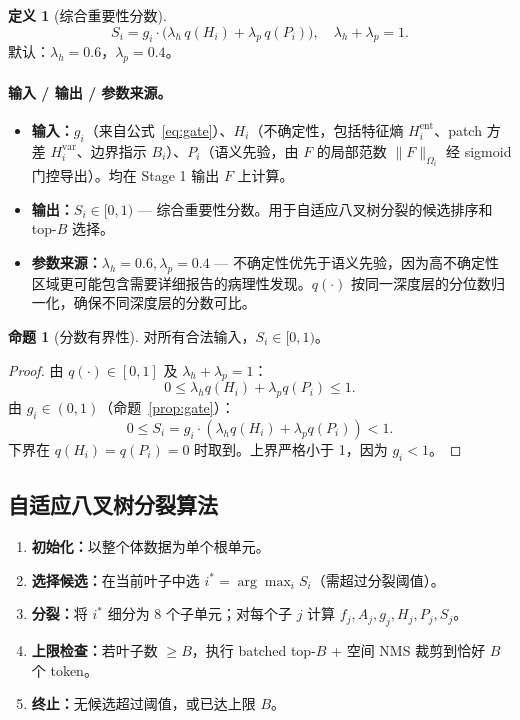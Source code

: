 \documentclass[11pt,a4paper]{article}
\theoremstyle{definition}
\newtheorem{definition}{定义}[section]
\newtheorem{proposition}{命题}[section]
\begin{document}
\begin{definition}[综合重要性分数]
\begin{equation}\label{eq:score}
S_i = g_i \cdot \big(\lambda_h \, q(H_i) + \lambda_p \, q(P_i)\big), \quad \lambda_h + \lambda_p = 1.
\end{equation}
默认：$\lambda_h = 0.6$，$\lambda_p = 0.4$。

\paragraph{输入 / 输出 / 参数来源。}
\begin{itemize}[nosep]
    \item \textbf{输入：}$g_i$（来自公式~\ref{eq:gate}）、$H_i$（不确定性，包括特征熵 $H_i^{\mathrm{ent}}$、patch 方差 $H_i^{\mathrm{var}}$、边界指示 $B_i$）、$P_i$（语义先验，由 $F$ 的局部范数 $\|F\|_{\Omega_i}$ 经 sigmoid 门控导出）。均在 Stage 1 输出 $F$ 上计算。
    \item \textbf{输出：}$S_i \in [0,1)$ — 综合重要性分数。用于自适应八叉树分裂的候选排序和 top-$B$ 选择。
    \item \textbf{参数来源：}$\lambda_h = 0.6, \lambda_p = 0.4$ — 不确定性优先于语义先验，因为高不确定性区域更可能包含需要详细报告的病理性发现。$q(\cdot)$ 按同一深度层的分位数归一化，确保不同深度层的分数可比。
\end{itemize}
\end{definition}

\begin{proposition}[分数有界性]\label{prop:score}
对所有合法输入，$S_i \in [0, 1)$。
\end{proposition}
\begin{proof}
由 $q(\cdot) \in [0,1]$ 及 $\lambda_h + \lambda_p = 1$：
\[
0 \leq \lambda_h q(H_i) + \lambda_p q(P_i) \leq 1.
\]
由 $g_i \in (0,1)$（命题~\ref{prop:gate}）：
\[
0 \leq S_i = g_i \cdot (\lambda_h q(H_i) + \lambda_p q(P_i)) < 1.
\]
下界在 $q(H_i)=q(P_i)=0$ 时取到。上界严格小于 1，因为 $g_i < 1$。
\end{proof}


\subsection{自适应八叉树分裂算法}

\begin{enumerate}
    \item \textbf{初始化：}以整个体数据为单个根单元。
    \item \textbf{选择候选：}在当前叶子中选 $i^* = \arg\max_i S_i$（需超过分裂阈值）。
    \item \textbf{分裂：}将 $i^*$ 细分为 8 个子单元；对每个子 $j$ 计算 $f_j, A_j, g_j, H_j, P_j, S_j$。
    \item \textbf{上限检查：}若叶子数 $\geq B$，执行 batched top-$B$ + 空间 NMS 裁剪到恰好 $B$ 个 token。
    \item \textbf{终止：}无候选超过阈值，或已达上限 $B$。
\end{enumerate}
\end{document}
